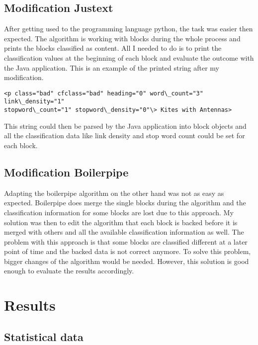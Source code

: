 \subsection{Modification Justext}
\label{subsec:Modification Justext}

After getting used to the programming language python, the task was easier then expected. The algorithm is working with blocks during the whole process and prints the blocks classified as content. All I needed to do is to print the classification values at the beginning of each block and evaluate the outcome with the Java application.
This is an example of the printed string after my modification.

\begin{lstlisting}
<p class="bad" cfclass="bad" heading="0" word\_count="3" link\_density="1" 
stopword\_count="1" stopword\_density="0"\> Kites with Antennas>
\end{lstlisting}

This string could then be parsed by the Java application into block objects and all the classification data like link density and stop word count could be set for each block.


\subsection{Modification Boilerpipe}

Adapting the boilerpipe algorithm on the other hand was not as easy as expected. Boilerpipe does merge the single blocks during the algorithm and the classification information for some blocks are lost due to this approach. My solution was then to edit the algorithm that each block is backed before it is merged with others and all the available classification information as well. The problem with this approach is that some blocks are classified different at a later point of time and the backed data is not correct anymore. To solve this problem, bigger changes of the algorithm would be needed. However, this solution is good enough to evaluate the results accordingly.


\section{Results}


\subsection{Statistical data}

